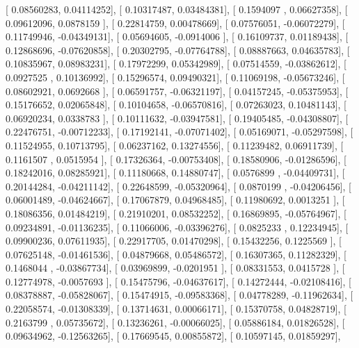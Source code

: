 \documentclass{article}
\begin{document}
       [ 0.08560283,  0.04114252],
       [ 0.10317487,  0.03484381],
       [ 0.1594097 ,  0.06627358],
       [ 0.09612096,  0.0878159 ],
       [ 0.22814759,  0.00478669],
       [ 0.07576051, -0.06072279],
       [ 0.11749946, -0.04349131],
       [ 0.05694605, -0.0914006 ],
       [ 0.16109737,  0.01189438],
       [ 0.12868696, -0.07620858],
       [ 0.20302795, -0.07764788],
       [ 0.08887663,  0.04635783],
       [ 0.10835967,  0.08983231],
       [ 0.17972299,  0.05342989],
       [ 0.07514559, -0.03862612],
       [ 0.0927525 ,  0.10136992],
       [ 0.15296574,  0.09490321],
       [ 0.11069198, -0.05673246],
       [ 0.08602921,  0.0692668 ],
       [ 0.06591757, -0.06321197],
       [ 0.04157245, -0.05375953],
       [ 0.15176652,  0.02065848],
       [ 0.10104658, -0.06570816],
       [ 0.07263023,  0.10481143],
       [ 0.06920234,  0.0338783 ],
       [ 0.10111632, -0.03947581],
       [ 0.19405485, -0.04308807],
       [ 0.22476751, -0.00712233],
       [ 0.17192141, -0.07071402],
       [ 0.05169071, -0.05297598],
       [ 0.11524955,  0.10713795],
       [ 0.06237162,  0.13274556],
       [ 0.11239482,  0.06911739],
       [ 0.1161507 ,  0.0515954 ],
       [ 0.17326364, -0.00753408],
       [ 0.18580906, -0.01286596],
       [ 0.18242016,  0.08285921],
       [ 0.11180668,  0.14880747],
       [ 0.0576899 , -0.04409731],
       [ 0.20144284, -0.04211142],
       [ 0.22648599, -0.05320964],
       [ 0.0870199 , -0.04206456],
       [ 0.06001489, -0.04624667],
       [ 0.17067879,  0.04968485],
       [ 0.11980692,  0.0013251 ],
       [ 0.18086356,  0.01484219],
       [ 0.21910201,  0.08532252],
       [ 0.16869895, -0.05764967],
       [ 0.09234891, -0.01136235],
       [ 0.11066006, -0.03396276],
       [ 0.0825233 ,  0.12234945],
       [ 0.09900236,  0.07611935],
       [ 0.22917705,  0.01470298],
       [ 0.15432256,  0.1225569 ],
       [ 0.07625148, -0.01461536],
       [ 0.04879668,  0.05486572],
       [ 0.16307365,  0.11282329],
       [ 0.1468044 , -0.03867734],
       [ 0.03969899, -0.0201951 ],
       [ 0.08331553,  0.0415728 ],
       [ 0.12774978, -0.0057693 ],
       [ 0.15475796, -0.04637617],
       [ 0.14272444, -0.02108416],
       [ 0.08378887, -0.05828067],
       [ 0.15474915, -0.09583368],
       [ 0.04778289, -0.11962634],
       [ 0.22058574, -0.01308339],
       [ 0.13714631,  0.00066171],
       [ 0.15370758,  0.04828719],
       [ 0.2163799 ,  0.05735672],
       [ 0.13236261, -0.00066025],
       [ 0.05886184,  0.01826528],
       [ 0.09634962, -0.12563265],
       [ 0.17669545,  0.00855872],
       [ 0.10597145,  0.01859297],
\end{document}
